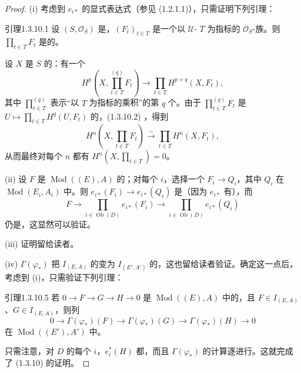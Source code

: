 \begin{proof}
(i) 考虑到 $e_{i*}$ 的显式表达式（参见 (1.2.1.1)），只需证明下列引理：
\begin{SGAresult}{引理}{1.3.10.1}
设 $(S,\mathcal O_S)$ 是，$(F_t)_{t\in T}$ 是一个以 $\mathcal U$- $T$ 为指标的 $\mathcal O_S$-族。则 $\prod_{t\in T}F_t$ 是的。
\end{SGAresult}
设 $X$ 是 $S$ 的：有一个
\[
H^p\left(X,\prod_{t\in T}^{(q)}F_t\right)
\longrightarrow\prod_{t\in T}H^{p+q}(X,F_t), \tag{1.3.10.2}
\]
其中 $\prod_{t\in T}^{(q)}$ 表示“以 $T$ 为指标的乘积”的第 $q$ 个。由于 $\prod_{t\in T}^{(q)}F_t$ 是 $U\mapsto\prod_{t\in T}H^q(U,F_t)$ 的，(1.3.10.2) ，得到
\[
H^n\left(X,\prod_{t\in T}F_t\right)\xrightarrow{\sim}\prod_{t\in T}H^n(X,F_t), \tag{1.3.10.3}
\]
从而最终对每个 $n$ 都有 $H^n(X,\prod_{t\in T})=0$。

(ii) 设 $F$ 是 $\operatorname{Mod}((E),A)$ 的；对每个 $i$，选择一个 $F_i\to Q_i$，其中 $Q_i$ 在 $\operatorname{Mod}(E_i,A_i)$ 中。则 $e_{i*}(F_i)\to e_{i*}(Q_i)$ 是（因为 $e_{i*}$ 有），而
\[
F\longrightarrow\prod_{i\in\operatorname{Ob}(D)}e_{i*}(F_i)
\longrightarrow\prod_{i\in\operatorname{Ob}(D)}e_{i*}(Q_i) \tag{1.3.10.4}
\]
仍是，这显然可以验证。

(iii) 证明留给读者。

(iv)  $\Gamma(\varphi_*)$ 把 $I_{(E,A)}$ 的变为 $I_{(E',A')}$ 的，这也留给读者验证。确定这一点后，考虑到 (i)，只需验证下列引理：
\begin{SGAresult}{引理}{1.3.10.5}
若 $0\to F\to G\to H\to0$ 是 $\operatorname{Mod}((E),A)$ 中的，且 $F\in I_{(E,A)}$、$G\in I_{(E,A)}$，则列
\[
0\longrightarrow\Gamma(\varphi_*)(F)\longrightarrow\Gamma(\varphi_*)(G)
\longrightarrow\Gamma(\varphi_*)(H)\longrightarrow0
\]
在 $\operatorname{Mod}((E'),A')$ 中。
\end{SGAresult}
只需注意，对 $D$ 的每个 $i$，$e_i^*(H)$ 都，而且 $\Gamma(\varphi_*)$ 的计算逐进行。这就完成了 (1.3.10) 的证明。
\end{proof}

